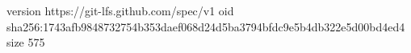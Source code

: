 version https://git-lfs.github.com/spec/v1
oid sha256:1743afb9848732754b353daef068d24d5ba3794bfdc9e5b4db322e5d00bd4ed4
size 575
